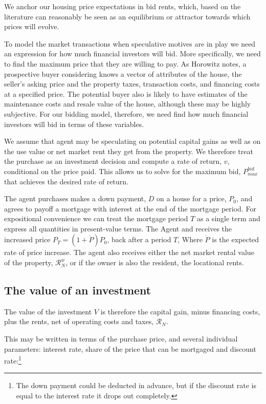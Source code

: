 We anchor our housing price expectations in bid rents, which, based on the literature can reasonably be seen as an equilibrium or attractor towards which prices will evolve. 

To model the market transactions when speculative motives are in play we need an expression for how much financial investors will bid. More specifically, we need to find the maximum price that they are willing to pay. As Horowitz \cite{horowitzBiddingModelsHousing1986} notes, a prospective buyer  considering knows a vector of attributes of the house, the seller’s asking price and the property taxes, transaction costs, and financing costs at a specified price. The  potential buyer also is likely to have estimates of the maintenance costs and resale value of the house, although these may be highly subjective. For our bidding model, therefore, we need find how much financial investors will bid in terms of these variables.

 We assume that agent may be  speculating on potential \glspl{capital gain} as well as on the \gls{use value} or net market rent they get from the property. We therefore treat the purchase as an investment decision and compute a rate of return, $v$, conditional on the price paid. This allows us to solve for the maximum bid, $P_{max}^{bid}$ that achieves the desired rate of return. 
    
 The agent purchases makes a down payment, $D$ on a house for a price, $P_0$, and agrees to payoff a mortgage with interest at the end of the mortgage period. For expositional convenience we can treat the mortgage period $T$ as a single term and express all quantities  in present-value terms. The Agent 
 and receives the increased price $P_T = (1 + \dot P)P_0$, back after a period $T$, Where $\dot P$ is the expected rate of price increase. The agent also receives either the net market rental value of the property, $\mathcal{R}^w_N$, or if the owner is also the resident, the locational rents.

 \subsection{The value of an investment}
The value of the investment $V$ is therefore the capital gain, minus financing costs, plus the rents, net of operating costs and taxes, $\mathcal{R}_N$.
 
 This may be written in terms of the purchase price, and several individual parameters: interest  rate, share of the price that can be mortgaged and  discount rate:\footnote{The down payment could be deducted in advance, but if the discount rate is equal to the interest rate it drops out completely.}
 
